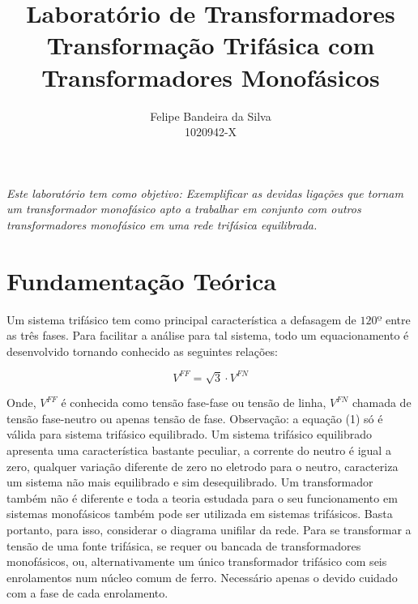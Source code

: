 \documentclass[paper=a4, fontsize=11pt]{article}
\title{Laboratório de Transformadores\\Transformação Trifásica com Transformadores Monofásicos}
\author{Felipe Bandeira da Silva\\1020942-X}
\begin{document}
\maketitle


\textit{Este laboratório tem como objetivo: Exemplificar as devidas ligações que tornam um
transformador monofásico apto a trabalhar em conjunto com outros transformadores monofásico
em uma rede trifásica equilibrada.}

\newpage

\tableofcontents

\newpage

\listoffigures


\newpage
\section{Fundamentação Teórica}

Um sistema trifásico tem como principal característica a defasagem de $120º$ entre
as três fases. Para facilitar a análise para tal sistema, todo um equacionamento
é desenvolvido tornando conhecido as seguintes relações:

\begin{equation}
    V^{FF} = \sqrt{3} \cdot V^{FN}
\end{equation}

Onde, $V^{FF}$ é conhecida como tensão fase-fase ou tensão de linha, $V^{FN}$ chamada
de tensão fase-neutro ou apenas tensão de fase. Observação: a equação (1) só é válida
para sistema trifásico equilibrado. Um sistema trifásico equilibrado apresenta uma
característica bastante peculiar, a corrente do neutro é igual a zero, qualquer
variação diferente de zero no eletrodo para o neutro, caracteriza um sistema não mais
equilibrado e sim desequilibrado. Um transformador também não é diferente e toda a teoria
estudada para o seu funcionamento em sistemas monofásicos também pode ser utilizada em
sistemas trifásicos. Basta portanto, para isso, considerar o diagrama unifilar da rede.
Para se transformar a tensão de uma fonte trifásica, se requer ou bancada de transformadores
monofásicos, ou, alternativamente  um único transformador trifásico com seis enrolamentos
num núcleo comum de ferro. Necessário apenas o devido cuidado com a fase de cada
enrolamento.
\end{document}
